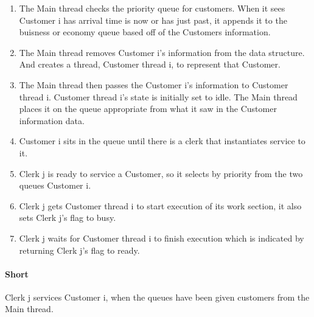 \documentclass[12pt, letterpaper]{article}
\begin{document}
\begin{enumerate}
	\item The Main thread checks the priority queue for customers. When it sees Customer i has arrival time is now or has just past, it appends it to the buisness or economy queue based off of the Customers information.

	\item The Main thread removes Customer i's information from the data structure. And creates a thread, Customer thread i, to represent that Customer.

	\item The Main thread then passes the Customer i's information to Customer thread i. Customer thread i's state is initially set to idle. The Main thread places it on the queue appropriate from what it saw in the Customer information data.

	\item Customer i sits in the queue until there is a clerk that instantiates service to it.

	\item Clerk j is ready to service a Customer, so it selects by priority from the two queues Customer i.
	
	\item Clerk j gets Customer thread i to start execution of its work section, it also sets Clerk j's flag to busy.
			
	\item Clerk j waits for Customer thread i to finish execution which is indicated by returning Clerk j's flag to ready.
\end{enumerate}

\paragraph{Short}
Clerk j services Customer i, when the queues have been given customers from the Main thread.
\end{document}
